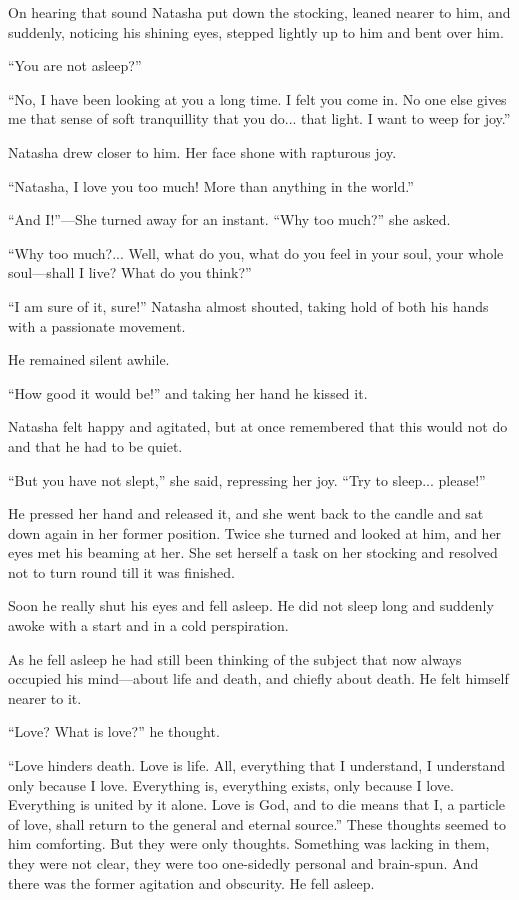 On hearing that sound Natasha put down the stocking, leaned
nearer to him, and suddenly, noticing his shining eyes, stepped
lightly up to him and bent over him.

``You are not asleep?''

``No, I have been looking at you a long time. I felt you come
in. No one else gives me that sense of soft tranquillity that you
do... that light.  I want to weep for joy.''

Natasha drew closer to him. Her face shone with rapturous joy.

``Natasha, I love you too much! More than anything in the
world.''

``And I!''---She turned away for an instant. ``Why too much?''
she asked.

``Why too much?... Well, what do you, what do you feel in your
soul, your whole soul---shall I live? What do you think?''

``I am sure of it, sure!'' Natasha almost shouted, taking hold of
both his hands with a passionate movement.

He remained silent awhile.

``How good it would be!'' and taking her hand he kissed it.

Natasha felt happy and agitated, but at once remembered that this
would not do and that he had to be quiet.

``But you have not slept,'' she said, repressing her joy. ``Try
to sleep...  please!''

He pressed her hand and released it, and she went back to the
candle and sat down again in her former position. Twice she
turned and looked at him, and her eyes met his beaming at
her. She set herself a task on her stocking and resolved not to
turn round till it was finished.

Soon he really shut his eyes and fell asleep. He did not sleep
long and suddenly awoke with a start and in a cold perspiration.

As he fell asleep he had still been thinking of the subject that
now always occupied his mind---about life and death, and chiefly
about death.  He felt himself nearer to it.

``Love? What is love?'' he thought.

``Love hinders death. Love is life. All, everything that I
understand, I understand only because I love. Everything is,
everything exists, only because I love. Everything is united by
it alone. Love is God, and to die means that I, a particle of
love, shall return to the general and eternal source.'' These
thoughts seemed to him comforting. But they were only
thoughts. Something was lacking in them, they were not clear,
they were too one-sidedly personal and brain-spun. And there was
the former agitation and obscurity. He fell asleep.

